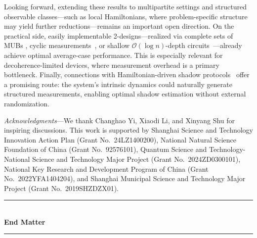 \documentclass[aps,pra,twocolumn,nofootinbib,superscriptaddress,10pt]{revtex4-2}
\newcommand{\caO}{\mathcal{O}}
\begin{document}
Looking forward, extending these results to multipartite settings and structured observable classes---such as local Hamiltonians, where problem-specific structure may yield further reductions---remains an important open direction. On the practical side, easily implementable 2-designs---realized via complete sets of MUBs \cite{Zhang24,WangC24}, cyclic measurements~\cite{Gonzalez25}, or shallow $\caO(\log n)$-depth circuits~\cite{Cleve16,Bertoni24,Hu25,Schuster25}---already achieve optimal average-case performance. This is especially relevant for decoherence-limited devices, where measurement overhead is a primary bottleneck. Finally, connections with Hamiltonian-driven shadow protocols~\cite{Hu22,Liu24} offer a promising route: the system's intrinsic dynamics could naturally generate structured measurements, enabling optimal shadow estimation without external randomization.

	
    \emph{Acknowledgments}---We thank Changhao Yi, Xiaodi Li, and Xinyang Shu for inspiring discussions. This work is supported by Shanghai Science and Technology Innovation Action Plan (Grant No.\ 24LZ1400200), National Natural Science Foundation of China (Grant No.\ 92576101), 
    Quantum Science and Technology-National Science and Technology Major Project (Grant No.\ 2024ZD0300101), National Key Research and Development Program of China (Grant No.\ 2022YFA1404204), and Shanghai Municipal Science and Technology Major Project (Grant No.\ 2019SHZDZX01).

\let\oldaddcontentsline\addcontentsline
\renewcommand{\addcontentsline}[3]{}

\let\addcontentsline\oldaddcontentsline
	
\clearpage
\newpage
	\onecolumngrid
	\vspace{0.8cm}
	\begin{center}
		\rule{0.5\textwidth}{0.4pt}\\[6pt]
		{\large\textbf{End Matter}}\\[6pt]
		\rule{0.5\textwidth}{0.4pt}
	\end{center}
	\twocolumngrid
	

\end{document}
